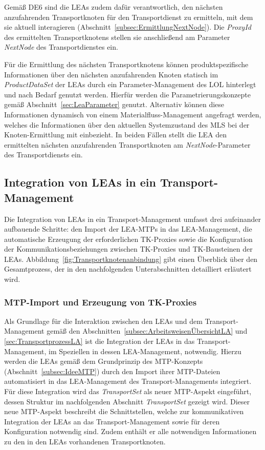 Gemäß DE6 sind die LEAs zudem dafür verantwortlich, den nächsten anzufahrenden Transportknoten für den Transportdienst zu ermitteln, mit dem sie aktuell interagieren (Abschnitt~\ref{subsec:ErmittlungNextNode}). Die \emph{ProxyId} des ermittelten Transportknotens stellen sie anschließend am Parameter \emph{NextNode} des Transportdienstes ein. 

Für die Ermittlung des nächsten Transportknotens können produktspezifische Informationen über den nächsten anzufahrenden Knoten statisch im \emph{Product\-Data\-Set} der LEAs durch ein Parameter-Management des LOL hinterlegt und nach Bedarf genutzt werden. Hierfür werden die Parametrierungskonzepte gemäß Abschnitt~\ref{sec:LeaParameter} genutzt. Alternativ können diese Informationen dynamisch von einem Materialfluss-Management angefragt werden, welches die Informationen über den aktuellen Systemzustand des MLS bei der Knoten-Ermittlung mit einbezieht. In beiden Fällen stellt die LEA den ermittelten nächsten anzufahrenden Transportknoten am \emph{NextNode}-Parameter des Transportdiensts ein.

\subsection{Integration von LEAs in ein Transport-Management}
\label{subsec:IntegrationLeaTm}

Die Integration von LEAs in ein Transport-Management umfasst drei aufeinander aufbauende Schritte: den Import der LEA-MTPs in das LEA-Management, die automatische Erzeugung der erforderlichen TK-Proxies sowie die Konfiguration der Kommunikationsbeziehungen zwischen TK-Proxies und TK-Bausteinen der LEAs. Abbildung~\ref{fig:Transportknotenanbindung} gibt einen Überblick über den Gesamtprozess, der in den nachfolgenden Unterabschnitten detailliert erläutert wird.

\subsubsection{MTP-Import und Erzeugung von TK-Proxies}

Als Grundlage für die Interaktion zwischen den LEAs und dem Transport-Management gemäß den Abschnitten~\ref{subsec:ArbeitsweisenÜbersichtLA} und \ref{sec:TransportprozessLA} ist die Integration der LEAs in das Transport-Management, im Speziellen in dessen LEA-Management, notwendig. Hierzu werden die LEAs gemäß dem Grundprinzip des MTP-Konzepts \cite{PNO.2025.Part1} (Abschnitt~\ref{subsec:IdeeMTP}) durch den Import ihrer MTP-Dateien automatisiert in das LEA-Management des Transport-Managements integriert. Für diese Integration wird das \emph{TransportSet} als neuer MTP-Aspekt eingeführt, dessen Struktur im nachfolgenden Abschnitt \emph{TransportSet} gezeigt wird. Dieser neue MTP-Aspekt beschreibt die Schnittstellen, welche zur kommunikativen Integration der LEAs an das Transport-Management sowie für deren Konfiguration notwendig sind. Zudem enthält er alle notwendigen Informationen zu den in den LEAs vorhandenen Transportknoten.

